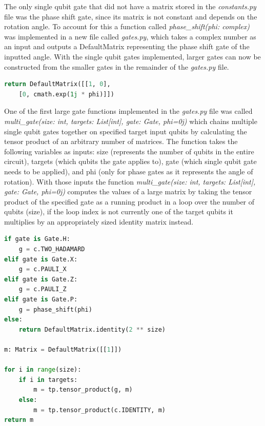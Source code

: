 \documentclass{article}
\begin{document}
The only single qubit gate that did not have a matrix stored in the \textit{constants.py} file was the phase shift gate, since its matrix is not constant and depends on the rotation angle. To account for this a function called \textit{phase\_shift(phi: complex)} was implemented in a new file called \textit{gates.py}, which takes a complex number as an input and outputs a DefaultMatrix representing the phase shift gate of the inputted angle. With the single qubit gates implemented, larger gates can now be constructed from the smaller gates in the remainder of the \textit{gates.py} file.

\begin{file}
\begin{lstlisting}[language=Python]
return DefaultMatrix([[1, 0], 
	[0, cmath.exp(1j * phi)]])
\end{lstlisting}
\end{file}



One of the first large gate functions implemented in the \textit{gates.py} file was called \textit{multi\_gate(size: int, targets: List[int], gate: Gate, phi=0j)} which chains multiple single qubit gates together on specified target input qubits by calculating the tensor product of an arbitrary number of matrices. The function takes the following variables as inputs: size (represents the number of qubits in the entire circuit), targets (which qubits the gate applies to), gate (which single qubit gate needs to be applied), and phi (only for phase gates as it represents the angle of rotation). With those inputs the function \textit{multi\_gate(size: int, targets: List[int], gate: Gate, phi=0j)} computes the values of a large matrix by taking the tensor product of the specified gate as a running product in a loop over the number of qubits (size), if the loop index is not currently one of the target qubits it multiplies by an appropriately sized identity matrix instead.

\begin{file}
\begin{lstlisting}[language=Python]
if gate is Gate.H:
    g = c.TWO_HADAMARD
elif gate is Gate.X:
    g = c.PAULI_X
elif gate is Gate.Z:
    g = c.PAULI_Z
elif gate is Gate.P:
    g = phase_shift(phi)
else:
    return DefaultMatrix.identity(2 ** size)

m: Matrix = DefaultMatrix([[1]])

for i in range(size):
    if i in targets:
        m = tp.tensor_product(g, m)
    else:
        m = tp.tensor_product(c.IDENTITY, m)
return m

\end{lstlisting}
\end{file}
\end{document}
